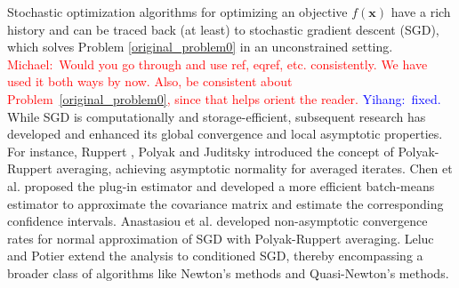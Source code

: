 \documentclass[aos]{imsart}
\numberwithin{equation}{section}
\theoremstyle{plain}
\newcommand{\michael}[1]{\textcolor{red}{Michael:\ #1}}
\newcommand{\yihang}[1]{\textcolor{blue}{Yihang:\ #1}}
\begin{document}
Stochastic optimization algorithms for optimizing an objective $f(\bm{x})$ have a rich history and can be traced back (at least) to stochastic gradient descent (SGD), which solves Problem \eqref{original_problem0} in an unconstrained setting. 
\michael{Would you go through and use ref, eqref, etc. consistently. We have used it both ways by now.  Also, be consistent about Problem~\eqref{original_problem0}, since that helps orient the reader.}
\yihang{fixed.}
While SGD is computationally and storage-efficient, subsequent research has developed and enhanced its global convergence and local asymptotic properties.
For instance, Ruppert \cite{ruppert1988efficient}, Polyak and Juditsky\cite{polyak1992acceleration} introduced the concept of Polyak-Ruppert averaging, achieving asymptotic normality for averaged iterates.
Chen et al. \cite{chen2020statistical} proposed the plug-in estimator and developed a more efficient batch-means estimator to approximate the covariance matrix and estimate the corresponding confidence intervals. 
Anastasiou et al. \cite{anastasiou2019normal} developed non-asymptotic convergence rates for normal approximation of SGD with Polyak-Ruppert averaging. 
Leluc and Potier \cite{leluc2020asymptotic} extend the analysis to conditioned SGD, thereby encompassing a broader class of algorithms like Newton's methods and Quasi-Newton's methods.
\end{document}

